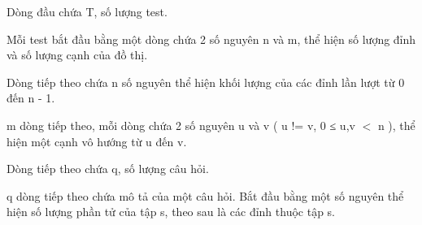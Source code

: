 Dòng đầu chứa T, số lượng test.  

   Mỗi test bắt đầu bằng một dòng chứa 2 số nguyên n và  m, thể hiện số lượng đỉnh và số lượng cạnh của đồ thị.  

   Dòng tiếp theo chứa n số nguyên thể hiện khối lượng của các đỉnh lần lượt từ 0 đến n - 1.  

   m dòng tiếp theo, mỗi dòng chứa 2 số nguyên u và v ( u != v, 0 ≤ u,v $<$ n ), thể hiện một cạnh vô hướng từ u đến v.  

   Dòng tiếp theo chứa q, số lượng câu hỏi.  

   q dòng tiếp theo chứa mô tả của một câu hỏi. Bắt đầu bằng một số nguyên thể hiện số lượng phần tử của tập s, theo sau là các đỉnh thuộc tập s.
